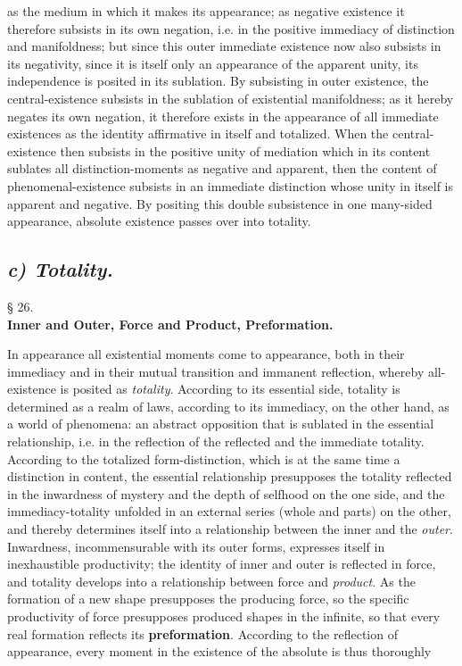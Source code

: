 \documentclass[12pt,a4paper,openany]{book}
\newcommand{\opage}[1]{\marginnote{\footnotesize\textit{[#1]}}}
\newcommand{\underafsnit}[1]{\subsection*{\centering\emph{#1}}\addcontentsline{toc}{subsection}{#1}}
\newcommand{\paragraf}[2]{\begin{center}§ #1.\\[0.2em]\textbf{#2}\end{center}}
\begin{document}
as the medium in which it makes its appearance; as
negative existence it therefore subsists in its own negation,
i.e. in the positive immediacy of distinction and manifoldness;
but since this outer immediate existence now
also subsists in its negativity, since it is itself
only an appearance of the apparent unity,
its independence is posited in its sublation. By
subsisting in outer existence, the central-existence subsists
in the sublation of existential manifoldness;
as it hereby negates its own negation, it therefore exists
in the appearance of all immediate existences
as the identity affirmative in itself and totalized. When
the central-existence then subsists in the positive
unity of mediation which in its content sublates all distinction-moments
as negative and apparent, then
the content of phenomenal-existence subsists in an immediate distinction
whose unity in itself is apparent and negative.
By positing this double subsistence in one many-sided
appearance, absolute existence passes over into
totality.
\setcounter{footnote}{0}%
\opage{180}\underafsnit{c) \textbf{Totality}.}
\paragraf{26}{Inner and Outer, Force and Product, Preformation.}

In appearance all existential moments come
to appearance, both in their immediacy and in
their mutual transition and immanent reflection,
whereby all-existence is posited as \emph{totality}. According to
its essential side, totality is determined as
a realm of laws, according to its immediacy, on the other hand,
as a world of phenomena: an abstract opposition that is sublated in the essential relationship, i.e. in
the reflection of the reflected and the immediate totality. According to the totalized form-distinction, which
is at the same time a distinction in content, the essential
relationship presupposes the totality reflected in the inwardness of mystery and
the depth of selfhood on the one side,
and the immediacy-totality unfolded in an external series
(whole and parts) on the other,
and thereby determines itself into a relationship between the inner and the \emph{outer}. Inwardness, incommensurable with its outer forms,
expresses itself in inexhaustible productivity; the identity of inner and outer is reflected in force, and totality develops
into a relationship between force and \emph{product}. As the formation of a new shape presupposes the
producing force, so the specific productivity of force
presupposes produced shapes in the
\setcounter{footnote}{0}%
\opage{181}infinite, so that every real formation reflects its
\textbf{preformation}. According to the reflection of appearance, every moment in the existence of the absolute is thus thoroughly
\end{document}
